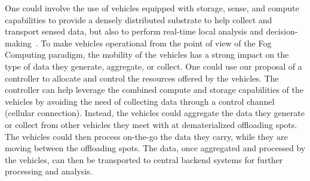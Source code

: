 One could involve the use of vehicles equipped with storage, sense, and compute capabilities to provide a densely distributed substrate to help collect and transport sensed data, but also to perform real-time local analysis and decision-making~\cite{bonomi2012fog,aubry2014crowdout}. To make vehicles operational from the point of view of the Fog Computing paradigm, the mobility of the vehicles has a strong impact on the type of data they generate, aggregate, or collect. One could use our proposal of a controller to allocate and control the resources offered by the vehicles. The controller can help leverage the combined compute and storage capabilities of the vehicles by avoiding the need of collecting data through a control channel (\eg cellular connection). Instead, the vehicles could aggregate the data they generate or collect from other vehicles they meet with at dematerialized offloading spots. The vehicles could then process on-the-go the data they carry, while they are moving between the offloading spots. 
The data, once aggregated and processed by the vehicles, can then be transported to central backend systems for further processing and analysis.


